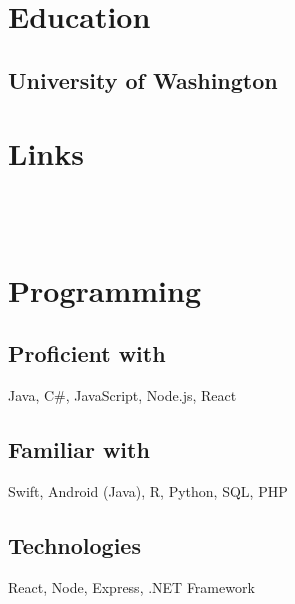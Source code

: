 \documentclass[]{deedy-resume-openfont}
\begin{document}
\begin{minipage}[t]{0.39\textwidth} 


\section{Education} 

\subsection{University of Washington}
\sectionsep


\section{Links} 
\href{https://github.com/yulongtan}{} \\
\href{https://www.linkedin.com/in/yulongtan}{} \\
\sectionsep


\section{Programming}
\subsection{Proficient with}
Java, C\#, JavaScript, Node.js, React \\ 
\sectionsep
\subsection{Familiar with}
Swift, Android (Java), R, Python, SQL, PHP \\
\sectionsep
\subsection{Technologies}
React, Node, Express, .NET Framework \\
\sectionsep

%
%

\end{minipage} 
\end{document}
